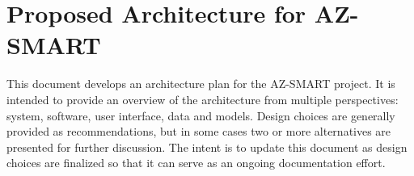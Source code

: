 \section{Proposed Architecture for AZ-SMART}
This document develops an architecture plan for the AZ-SMART project.  It is intended to provide an overview of the architecture from multiple perspectives: system, software, user interface, data and models.  Design choices are generally provided as recommendations, but in some cases two or more alternatives are presented for further discussion.  The intent is to update this document as design choices are finalized so that it can serve as an ongoing documentation effort.
